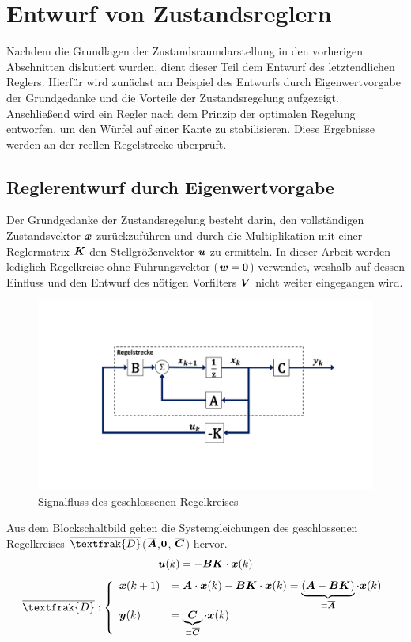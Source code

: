 \section{Entwurf von Zustandsreglern}
Nachdem die Grundlagen der Zustandsraumdarstellung in den vorherigen Abschnitten diskutiert wurden, dient dieser Teil dem Entwurf des letztendlichen Reglers. Hierfür wird zunächst am Beispiel des Entwurfs durch Eigenwertvorgabe der Grundgedanke und die Vorteile der Zustandsregelung aufgezeigt. Anschließend wird ein Regler nach dem Prinzip der optimalen Regelung entworfen, um den Würfel auf einer Kante zu stabilisieren. Diese Ergebnisse werden an der reellen Regelstrecke überprüft.

\subsection{Reglerentwurf durch Eigenwertvorgabe}
Der Grundgedanke der Zustandsregelung besteht darin, den vollständigen Zustandsvektor $\boldsymbol{x}$ zurückzuführen und durch die Multiplikation mit einer Reglermatrix $\boldsymbol{K}$ den Stellgrößenvektor $\boldsymbol{u}$ zu ermitteln. In dieser Arbeit werden lediglich Regelkreise ohne Führungsvektor ($\boldsymbol{w}=\boldsymbol{0}$) verwendet, weshalb auf dessen Einfluss und den Entwurf des nötigen Vorfilters $\boldsymbol{V}$ nicht weiter eingegangen wird.
\begin{figure}[H]
\centering
\includegraphics[width=0.8\linewidth, trim={3.5cm 3.5cm 3.5cm 3.5cm}, clip]{img/RT_ClosedLoop}
\caption{Signalfluss des geschlossenen Regelkreises}
\end{figure}
Aus dem Blockschaltbild gehen die Systemgleichungen des geschlossenen Regelkreises $\overline{\textfrak{D}}$($\overline{\boldsymbol{A}}$,$\boldsymbol{0}$, $\overline{\boldsymbol{C}}$) hervor.
\begin{equation}
\boldsymbol{u}(k) = -\boldsymbol{B}\boldsymbol{K}\cdot\boldsymbol{x}(k)
\end{equation}
\begin{equation}
\overline{\textfrak{D}}
: \left\{ \begin{array}{ll}
\bs{{x}}(k+1) &= \bs{A}\cdot \bs{x}(k) - \bs{B}\bs{K}\cdot \bs{x}(k) = \underbrace{(\bs{A}-\bs{B}\bs{K})}_{\equiv \bs{\overline{A}}}\cdot \bs{x}(k) \\
\bs{y}(k) &= \underbrace{\bs{C}}_{\equiv \bs{\overline{C}}}\cdot \bs{x}(k)
\end{array}
\right.
\end{equation}
